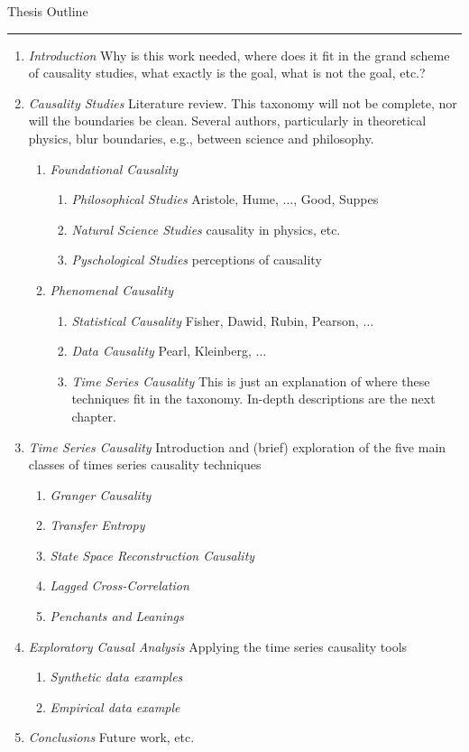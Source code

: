 \documentclass{article}[10pt]
\begin{document}
\Large{{\sc Thesis Outline}}

\rule{10cm}{1mm}

\begin{enumerate}
\item {\em Introduction} Why is this work needed, where does it fit in the grand scheme of causality studies, what exactly is the goal, what is not the goal, etc.?
\item {\em Causality Studies} Literature review.  This taxonomy will not be complete, nor will the boundaries be clean.  Several authors, particularly in theoretical physics, blur boundaries, e.g., between science and philosophy.
\begin{enumerate}
	\item {\em Foundational Causality} 
	\begin{enumerate}
		\item {\em Philosophical Studies} Aristole, Hume, $\ldots$, Good, Suppes
		\item {\em Natural Science Studies} causality in physics, etc.
        \item {\em Pyschological Studies} perceptions of causality
    \end{enumerate}
    \item {\em Phenomenal Causality}
    \begin{enumerate}
    	\item {\em Statistical Causality} Fisher, Dawid, Rubin, Pearson, $\ldots$
        \item {\em Data Causality} Pearl, Kleinberg, $\ldots$
        \item {\em Time Series Causality} This is just an explanation of where these techniques fit in the taxonomy.  In-depth descriptions are the next chapter.
    \end{enumerate}
\end{enumerate}
\item {\em Time Series Causality} Introduction and (brief) exploration of the five main classes of times series causality techniques
\begin{enumerate}
	\item {\em Granger Causality}
    \item {\em Transfer Entropy}
    \item {\em State Space Reconstruction Causality}
    \item {\em Lagged Cross-Correlation}
    \item {\em Penchants and Leanings}
\end{enumerate}
\item {\em Exploratory Causal Analysis} Applying the time series causality tools
\begin{enumerate}
	\item {\em Synthetic data examples}
    \item {\em Empirical data example}
\end{enumerate}
\item {\em Conclusions} Future work, etc.\
\end{enumerate}
\end{document}
